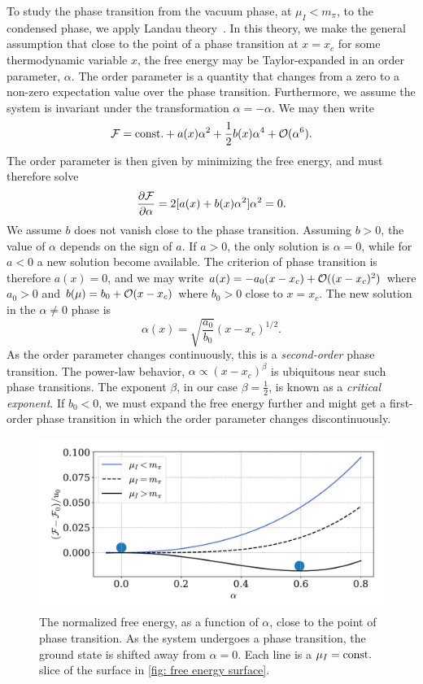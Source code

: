 To study the phase transition from the vacuum phase, at $\mu_I < m_\pi$, to the condensed phase, we apply Landau theory~\autocite{peskinIntroductionQuantumField1995}.
In this theory, we make the general assumption that close to the point of a phase transition at $x = x_c$ for some thermodynamic variable $x$, the free energy may be Taylor-expanded in an order parameter, $\alpha$.
The order parameter is a quantity that changes from a zero to a non-zero expectation value over the phase transition.
Furthermore, we assume the system is invariant under the transformation $\alpha = -\alpha$.
We may then write
%
\begin{equation}
    \mathcal{F} = \mathrm{const.} + a(x)\alpha^2 + \frac{1}{2} b(x)\alpha^4 + \mathcal O(\alpha^6).
\end{equation}
%
The order parameter is then given by minimizing the free energy, and must therefore solve
%
\begin{equation}
    \pdv{\mathcal{F}}{\alpha} = 2[a(x) + b(x) \alpha^2]\alpha^2 = 0.
\end{equation}
%
We assume $b$ does not vanish close to the phase transition.
Assuming $b > 0$, the value of $\alpha$ depends on the sign of $a$.
If $a>0$, the only solution is $\alpha = 0$, while for $a<0$ a new solution become available.
The criterion of phase transition is therefore $a(x) = 0$, and we may write $a(x) = -a_0(x - x_c) + \mathcal O((x - x_c)^2)$ where $a_0 > 0$ and $b(\mu) = b_0 + \mathcal O(x - x_c)$ where $b_0>0$ close to $x = x_c$. 
The new solution in the $\alpha \neq 0$ phase is
%
\begin{equation}
    \alpha(x) = \sqrt{\frac{a_0}{b_0}}(x - x_c)^{1/2}.
\end{equation}
%
As the order parameter changes continuously, this is a \emph{second-order} phase transition.
The power-law behavior, $\alpha \propto (x - x_c)^\beta$ is ubiquitous near such phase transitions.
The exponent $\beta$, in our case $\beta = \frac{1}{2}$, is known as a \emph{critical exponent}.
If $b_0<0$, we must expand the free energy further and might get a first-order phase transition in which the order parameter changes discontinuously.

\begin{figure}[!htb]
    \centering
    \includegraphics[width=.8\textwidth]{../scripts/figurer/phase_transition.pdf}
    \caption{
        The normalized free energy, as a function of $\alpha$, close to the point of phase transition. 
        As the system undergoes a phase transition, the ground state is shifted away from $\alpha = 0$.
        Each line is a $\mu_I=\mathrm{const.}$ slice of the surface in \autoref{fig: free energy surface}.
        }
    \label{fig: phase transition}
\end{figure}

